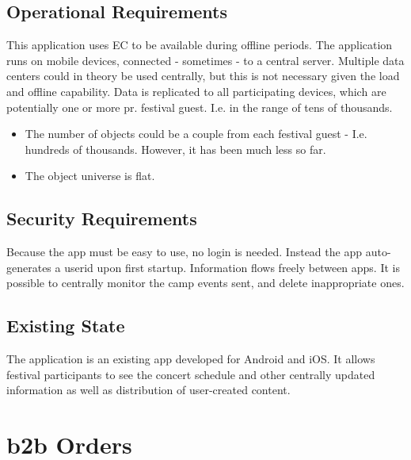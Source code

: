 \documentclass[11pt,a4paper]{report}
\begin{document}
\subsection{Operational Requirements}
This application uses EC to be available during offline periods.
The application runs on mobile devices, connected - sometimes - to a central server.
Multiple data centers could in theory be used centrally, but this is not necessary given the load and offline capability.
Data is replicated to all participating devices, which are potentially one or more pr. festival guest. I.e. in the range of tens of thousands.
\begin{itemize}
	\item The number of objects could be a couple from each festival guest - I.e. hundreds of thousands. However, it has been much less so far.
	\item The object universe is flat.
\end{itemize}

\subsection{Security Requirements}
Because the app must be easy to use, no login is needed. Instead the app auto-generates a userid upon first startup.
Information flows freely between apps.
It is possible to centrally monitor the camp events sent, and delete inappropriate ones.

\subsection{Existing State}
The application is an existing app developed for Android and iOS. It allows festival participants to see the concert schedule and other centrally updated information as well as distribution of user-created content.


\section{\gls{b2b} Orders}
\end{document}
